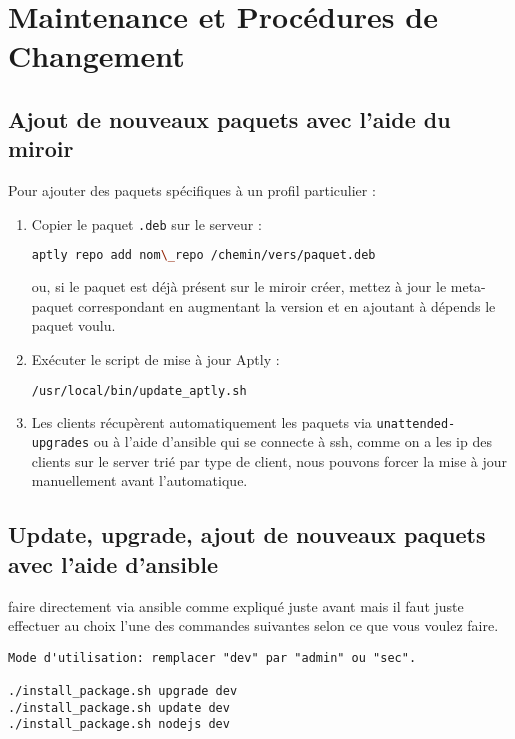 \documentclass[a4paper,12pt]{article}
\begin{document}
\section{Maintenance et Procédures de Changement}
\subsection{Ajout de nouveaux paquets avec l'aide du miroir}
Pour ajouter des paquets spécifiques à un profil particulier :

\begin{enumerate}
\item Copier le paquet \texttt{.deb} sur le serveur :
\begin{lstlisting}[language=bash]
aptly repo add nom\_repo /chemin/vers/paquet.deb
\end{lstlisting}
ou, si le paquet est déjà présent sur le miroir créer, mettez à jour le meta-paquet correspondant en augmentant la version et en ajoutant à dépends le paquet voulu.
\item Exécuter le script de mise à jour Aptly :
\begin{lstlisting}[language=bash]
/usr/local/bin/update_aptly.sh
\end{lstlisting}
\item Les clients récupèrent automatiquement les paquets via \texttt{unattended-upgrades} ou à l'aide d'ansible qui se connecte à ssh, comme on a les ip des clients sur le server trié par type de client, nous pouvons forcer la mise à jour manuellement avant l'automatique.
\end{enumerate}

\subsection{Update, upgrade, ajout de nouveaux paquets avec l'aide d'ansible}
faire directement via ansible comme expliqué juste avant mais il faut juste effectuer au choix l'une des commandes suivantes selon ce que vous voulez faire.
\begin{lstlisting}
Mode d'utilisation: remplacer "dev" par "admin" ou "sec".

./install_package.sh upgrade dev
./install_package.sh update dev
./install_package.sh nodejs dev
\end{lstlisting}
\end{document}
